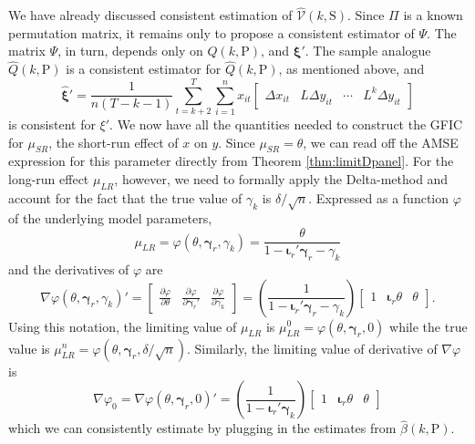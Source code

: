 We have already discussed consistent estimation of $\widehat{\mathcal{V}}(k,\text{S})$.
Since $\Pi$ is a known permutation matrix, it remains only to propose a consistent estimator of $\Psi$. 
The matrix $\Psi$, in turn, depends only on $Q(k,\text{P})$, and $\boldsymbol{\xi}'$.
The sample analogue $\widehat{Q}(k,\text{P})$ is a consistent estimator for $\widehat{Q}(k,\text{P})$, as mentioned above, and
\begin{equation}
  \widehat{\boldsymbol{\xi}}' = \frac{1}{n(T - k - 1)} \sum_{t = k+2}^T \sum_{i=1}^n x_{it}\left[
  \begin{array}{cccc}
    \Delta x_{it} & L \Delta y_{it} & \cdots & L^{k} \Delta y_{it} 
  \end{array}
\right]
\end{equation}
is consistent for $\xi'$.
We now have all the quantities needed to construct the GFIC for $\mu_{SR}$, the short-run effect of $x$ on $y$.
Since $\mu_{SR} = \theta$, we can read off the AMSE expression for this parameter directly from Theorem \ref{thm:limitDpanel}.
For the long-run effect $\mu_{LR}$, however, we need to formally apply the Delta-method and account for the fact that the true value of $\gamma_k$ is $\delta/\sqrt{n}$.
Expressed as a function $\varphi$ of the underlying model parameters, 
\[
  \mu_{LR} = \varphi(\theta, \boldsymbol{\gamma}_r, \gamma_k) = \frac{\theta}{1 - \boldsymbol{\iota}_r' \boldsymbol{\gamma}_r - \gamma_k}
\]
and the derivatives of $\varphi$ are
\[
  \nabla \varphi(\theta, \boldsymbol{\gamma}_r, \gamma_k)' = \left[
  \begin{array}{ccc}
    \displaystyle\frac{\partial \varphi}{\partial \theta} & 
    \displaystyle\frac{\partial \varphi}{\partial \boldsymbol{\gamma}_r'} &
    \displaystyle\frac{\partial \varphi}{\partial \gamma_k} 
  \end{array}
\right] = 
\left( \frac{1}{1 - \boldsymbol{\iota}_r' \boldsymbol{\gamma}_r - \gamma_k} \right) \left[
\begin{array}{ccc}
  1 & \boldsymbol{\iota}_r \theta & \theta 
\end{array}
\right].
\]
Using this notation, the limiting value of $\mu_{LR}$ is $\mu_{LR}^{0} =  \varphi(\theta, \boldsymbol{\gamma}_r, 0)$
while the true value is
$\mu_{LR}^{n} = \varphi(\theta, \boldsymbol{\gamma}_r, \delta/\sqrt{n})$.
Similarly, the limiting value of derivative of $\nabla\varphi$ is 
\[
  \nabla \varphi_0 = \nabla \varphi(\theta, \boldsymbol{\gamma}_r, 0)' = 
\left( \frac{1}{1 - \boldsymbol{\iota}_r' \boldsymbol{\gamma}_k} \right) \left[
\begin{array}{ccc}
  1 & \boldsymbol{\iota}_r \theta & \theta 
\end{array}
\right]
\]
which we can consistently estimate by plugging in the estimates from $\widehat{\beta}(k, \text{P})$.



